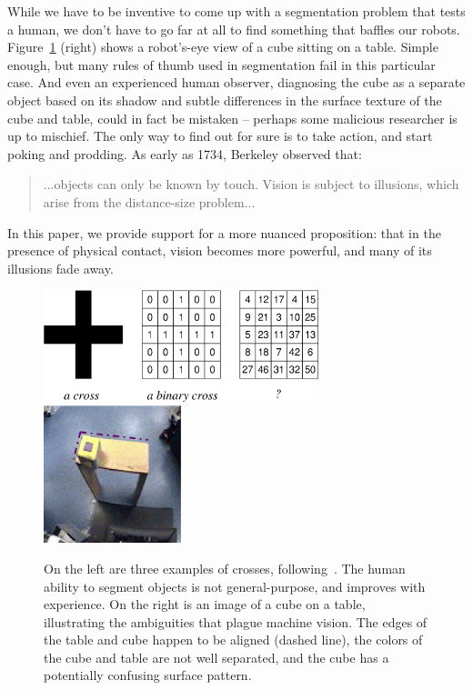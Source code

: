 While we have to be inventive to come up with a segmentation problem
that tests a human, we don't have to go far at all to find something
that baffles our robots.  Figure~\ref{fig:number-cross} (right) shows a
robot's-eye view of a cube sitting on a table.  Simple enough, but
many rules of thumb used in segmentation fail in this particular case.
And even an experienced human observer, diagnosing the cube as a
separate object based on its shadow and subtle differences in the
surface texture of the cube and table, could in fact be mistaken --
perhaps some malicious researcher is up to mischief.  The only way to
find out for sure is to take action, and start poking and prodding.
As early as 1734, Berkeley observed that:
%
\begin{quote}
...objects can only be known by
touch. Vision is subject to illusions, which arise from the
distance-size problem... \cite{berkeley72new}
\end{quote}
%
In this paper, we provide support for a more nuanced proposition: that
in the presence of physical contact, vision becomes more powerful, and many of
its illusions fade away.


%
\begin{figure}[tb]
\begin{center}
\includegraphics[width=8.0cm]{number-cross.eps}
\hspace{2cm}
\includegraphics[width=4cm]{setup-sequence.eps}
\caption{ 
\label{fig:number-cross}
%
On the left are three examples of crosses,
following~\cite{manzotti01coscienza}.  The human ability to segment
objects is not general-purpose, and improves with experience.
On the right is an image of a cube on a table, illustrating the
ambiguities that plague machine vision. 
The edges of the table and cube happen to be
aligned (dashed line), the colors of the cube and table are not well
separated, and the cube has a potentially confusing surface pattern.
%
}
\end{center}
\end{figure}
%
%

